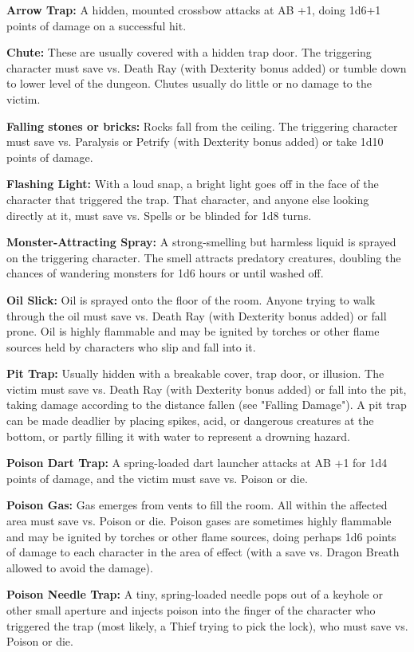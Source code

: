 \documentclass[a4paper,twoside,openany,10pt]{book}
\begin{document}
\begin{multicols}{2}
\textbf{Arrow Trap:} A hidden, mounted crossbow attacks at AB +1, doing 1d6+1 points of damage on a successful hit.

\textbf{Chute:} These are usually covered with a hidden trap door. The triggering character must save vs. Death Ray (with Dexterity bonus added) or tumble down to lower level of the dungeon. Chutes usually do little or no damage to the victim.

\textbf{Falling stones or bricks:} Rocks fall from the ceiling. The triggering character must save vs. Paralysis or Petrify (with Dexterity bonus added) or take 1d10 points of damage. 

\textbf{Flashing Light:} With a loud snap, a bright light goes off in the face of the character that triggered the trap. That character, and anyone else looking directly at it, must save vs. Spells or be blinded for 1d8 turns.

\textbf{Monster-Attracting Spray:} A strong-smelling but harmless liquid is sprayed on the triggering character. The smell attracts predatory creatures, doubling the chances of wandering monsters for 1d6 hours or until washed off.

\textbf{Oil Slick:} Oil is sprayed onto the floor of the room. Anyone trying to walk through the oil must save vs. Death Ray (with Dexterity bonus added) or fall prone. Oil is highly flammable and may be ignited by torches or other flame sources held by characters who slip and fall into it.

\textbf{Pit Trap:} Usually hidden with a breakable cover, trap door, or illusion. The victim must save vs. Death Ray (with Dexterity bonus added) or fall into the pit, taking damage according to the distance fallen (see "Falling Damage"). A pit trap can be made deadlier by placing spikes, acid, or dangerous creatures at the bottom, or partly filling it with water to represent a drowning hazard.

\textbf{Poison Dart Trap:} A spring-loaded dart launcher attacks at AB +1 for 1d4 points of damage, and the victim must save vs. Poison or die.

\textbf{Poison Gas:} Gas emerges from vents to fill the room. All within the affected area must save vs. Poison or die. Poison gases are sometimes highly flammable and may be ignited by torches or other flame sources, doing perhaps 1d6 points of damage to each character in the area of effect (with a save vs. Dragon Breath allowed to avoid the damage).

\textbf{Poison Needle Trap:} A tiny, spring-loaded needle pops out of a keyhole or other small aperture and injects poison into the finger of the character who triggered the trap (most likely, a Thief trying to pick the lock), who must save vs. Poison or die.


\end{multicols}
\end{document}
